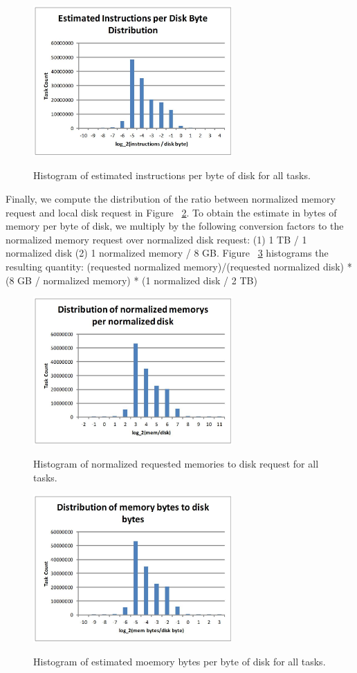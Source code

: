 \documentclass{sig-alternate}
\begin{document}
\begin{figure}
\centering
\includegraphics[width=3in]{../figures/est_req_cpu_disk.jpg}
\label{est_req_cpu_disk}
\caption{Histogram of estimated instructions per byte of disk for all tasks.}
\end{figure}

Finally, we compute the distribution of the ratio between normalized memory request and local disk request in Figure ~\ref{req_mem_disk}.
To obtain the estimate in bytes of memory per byte of disk, we multiply by the following conversion factors to the normalized memory request over normalized disk request: (1) 1 TB / 1 normalized disk (2) 1 normalized memory / 8 GB.
Figure ~\ref{est_req_mem_disk} histograms the resulting quantity:
(requested normalized memory)/(requested normalized disk) * (8 GB / normalized memory) * (1 normalized disk / 2 TB)

\begin{figure}
\centering
\includegraphics[width=3in]{../figures/req_mem_disk.jpg}
\label{req_mem_disk}
\caption{Histogram of normalized requested memories to disk request for all tasks.}
\end{figure}

\begin{figure}
\centering
\includegraphics[width=3in]{../figures/est_req_mem_disk.jpg}
\label{est_req_mem_disk}
\caption{Histogram of estimated moemory bytes per byte of disk for all tasks.}
\end{figure}
\end{document}
